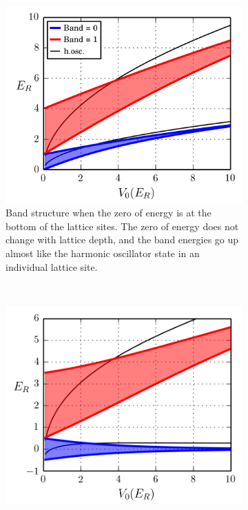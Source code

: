 \documentclass[11pt,letter]{article}
\begin{document}
\begin{figure}
        \centering
        \begin{subfigure}[t]{0.4\textwidth}
		\includegraphics[width=\textwidth]{figures/bands1d_V0_firstquant.png}
\caption{ Band structure when the zero of energy is at the bottom of the
lattice sites.  The zero of energy does not change with lattice depth, and the
band energies go up almost like the harmonic oscillator state in an individual
lattice site.  }
                \label{fig:Hubbard-firstquant}
        \end{subfigure}%
        ~~ %
        \begin{subfigure}[t]{0.4\textwidth}
		\includegraphics[width=\textwidth]{figures/bands1d_V0_secondquant.png}

\end{subfigure}
\end{figure}
\end{document}
